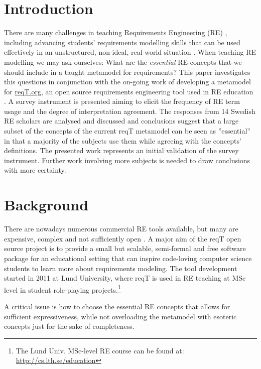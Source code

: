 \documentclass[a4paper]{llncs}
\begin{document}
\section{Introduction}
There are many challenges in teaching Requirements Engineering (RE) \cite{Memon2010, Regev2011}, including  advancing students' requirements modelling skills that can be used effectively in an unstructured, non-ideal, real-world situation \cite{Callele2006}. When teaching RE modelling we may ask ourselves: What are the \textit{essential} RE concepts that we should include in a taught metamodel for requirements? This paper investigates this questions in conjunction with the on-going work of developing a metamodel for \href{http://reqT.org}{reqT.org}, an open source requirements engineering tool used in RE education  \cite{Regnell2013}.
A survey instrument is presented aiming to elicit the frequency of RE term usage and the degree of interpretation agreement. The responses from 14 Swedish RE scholars are analysed and discussed and conclusions suggest that a large subset of the concepts of the current reqT metamodel can be seen as ''essential'' in that a majority of the subjects use them while agreeing with the concepts' definitions. The presented work represents an initial validation of the survey instrument. Further work involving more subjects is needed to draw conclusions with more certainty. 

\section{Background}

There are nowadays numerous commercial RE tools available, but many are expensive, complex and not sufficiently open  \cite{Carillo2011}. A major aim of the reqT open source project is to provide a small but scalable, semi-formal and free software package for an educational setting \cite{Regnell2013} that can inspire code-loving computer science students to learn more about requirements modeling. The tool development started in 2011 at Lund University, where reqT is used in RE teaching at MSc level in student role-playing projects.\footnote{\label{note:ets170}The Lund Univ. MSc-level RE course can be found at: \scriptsize\url{http://cs.lth.se/education}}

A critical issue is how to choose the essential RE concepts that allows for sufficient expressiveness, while not overloading the metamodel with esoteric concepts just for the sake of completeness. 
\end{document}
